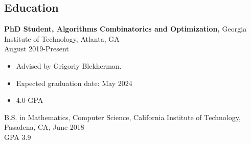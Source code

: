 \documentclass[margin]{res}
\begin{document}
 
 

\begin{resume} 

\section{Education} 
 {\bf PhD Student, Algorithms Combinatorics and Optimization,} Georgia Institute of Technology, Atlanta, GA\\ August 2019-Present
 \begin{itemize} \itemsep -2pt  %
 \item Advised by Grigoriy Blekherman.
 \item Expected graduation date: May 2024
 \item 4.0 GPA
 \end{itemize}

B.S. in Mathematics, Computer Science, California Institute of Technology, Pasadena, CA, June 2018 \\
GPA 3.9


\end{resume}
\end{document}
